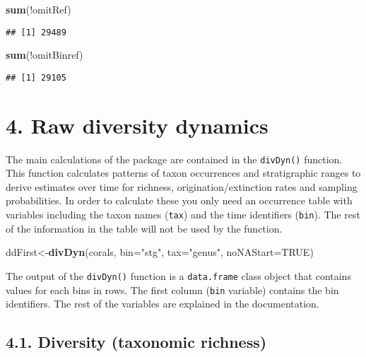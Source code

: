 \documentclass[]{article}
\newenvironment{Shaded}{\begin{snugshade}}{\end{snugshade}}
\newcommand{\KeywordTok}[1]{\textcolor[rgb]{0.13,0.29,0.53}{\textbf{{#1}}}}
\newcommand{\DataTypeTok}[1]{\textcolor[rgb]{0.13,0.29,0.53}{{#1}}}
\newcommand{\StringTok}[1]{\textcolor[rgb]{0.31,0.60,0.02}{{#1}}}
\newcommand{\OtherTok}[1]{\textcolor[rgb]{0.56,0.35,0.01}{{#1}}}
\newcommand{\NormalTok}[1]{{#1}}
\begin{document}
\begin{Shaded}
\begin{Highlighting}[]
\KeywordTok{sum}\NormalTok{(!omitRef)}
\end{Highlighting}
\end{Shaded}

\begin{verbatim}
## [1] 29489
\end{verbatim}

\begin{Shaded}
\begin{Highlighting}[]
\KeywordTok{sum}\NormalTok{(!omitBinref)}
\end{Highlighting}
\end{Shaded}

\begin{verbatim}
## [1] 29105
\end{verbatim}

\section{4. Raw diversity dynamics}\label{raw-diversity-dynamics}

The main calculations of the package are contained in the
\texttt{divDyn()} function. This function calculates patterns of taxon
occurrences and stratigraphic ranges to derive estimates over time for
richness, origination/extinction rates and sampling probabilities. In
order to calculate these you only need an occurrence table with
variables including the taxon names (\texttt{tax}) and the time
identifiers (\texttt{bin}). The rest of the information in the table
will not be used by the function.

\begin{Shaded}
\begin{Highlighting}[]
\NormalTok{ddFirst<-}\KeywordTok{divDyn}\NormalTok{(corals, }\DataTypeTok{bin=}\StringTok{"stg"}\NormalTok{, }\DataTypeTok{tax=}\StringTok{"genus"}\NormalTok{, }\DataTypeTok{noNAStart=}\OtherTok{TRUE}\NormalTok{)}
\end{Highlighting}
\end{Shaded}

The output of the \texttt{divDyn()} function is a \texttt{data.frame}
class object that contains values for each bins in rows. The first
column (\texttt{bin} variable) contains the bin identifiers. The rest of
the variables are explained in the documentation.

\subsection{4.1. Diversity (taxonomic
richness)}\label{diversity-taxonomic-richness}
\end{document}
